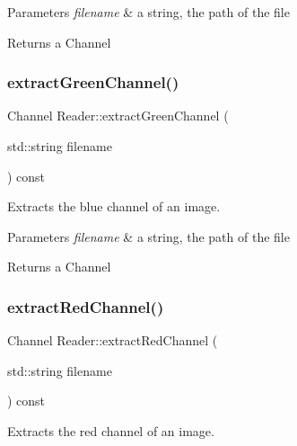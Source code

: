 \begin{DoxyParams}{Parameters}
{\em filename} & a string, the path of the file \\
\hline
\end{DoxyParams}
\begin{DoxyReturn}{Returns}
a Channel 
\end{DoxyReturn}
\mbox{\label{class_reader_a8a723ec9b5bebd04143b59e71f68c72a}} 
\subsubsection{\texorpdfstring{extract\+Green\+Channel()}{extractGreenChannel()}}
{\footnotesize\ttfamily Channel Reader\+::extract\+Green\+Channel (\begin{DoxyParamCaption}\item[{std\+::string}]{filename }\end{DoxyParamCaption}) const}



Extracts the blue channel of an image. 


\begin{DoxyParams}{Parameters}
{\em filename} & a string, the path of the file \\
\hline
\end{DoxyParams}
\begin{DoxyReturn}{Returns}
a Channel 
\end{DoxyReturn}
\mbox{\label{class_reader_a4d52dd9aeabc2888b551c9f05c4b6099}} 
\subsubsection{\texorpdfstring{extract\+Red\+Channel()}{extractRedChannel()}}
{\footnotesize\ttfamily Channel Reader\+::extract\+Red\+Channel (\begin{DoxyParamCaption}\item[{std\+::string}]{filename }\end{DoxyParamCaption}) const}



Extracts the red channel of an image. 


